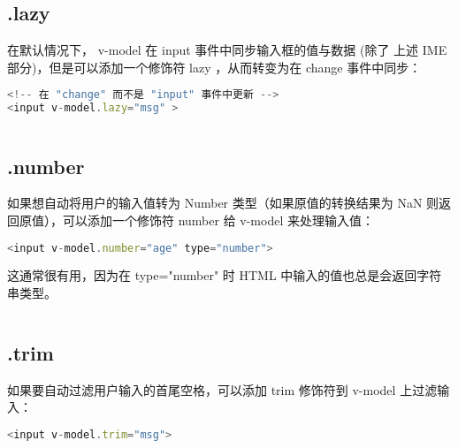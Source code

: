 \subsection{.lazy}

在默认情况下， v-model 在 input 事件中同步输入框的值与数据 (除了 上述 IME 部分)，但是可以添加一个修饰符 lazy ，从而转变为在 change 事件中同步：

\begin{lstlisting}[language=JavaScript]
<!-- 在 "change" 而不是 "input" 事件中更新 -->
<input v-model.lazy="msg" >
\end{lstlisting}





\begin{lstlisting}[language=JavaScript]

\end{lstlisting}


\subsection{.number}

如果想自动将用户的输入值转为 Number 类型（如果原值的转换结果为 NaN 则返回原值），可以添加一个修饰符 number 给 v-model 来处理输入值：

\begin{lstlisting}[language=JavaScript]
<input v-model.number="age" type="number">
\end{lstlisting}


这通常很有用，因为在 type="number" 时 HTML 中输入的值也总是会返回字符串类型。


\begin{lstlisting}[language=JavaScript]

\end{lstlisting}


\subsection{.trim}

如果要自动过滤用户输入的首尾空格，可以添加 trim 修饰符到 v-model 上过滤输入：

\begin{lstlisting}[language=JavaScript]
<input v-model.trim="msg">
\end{lstlisting}





\begin{lstlisting}[language=JavaScript]

\end{lstlisting}




